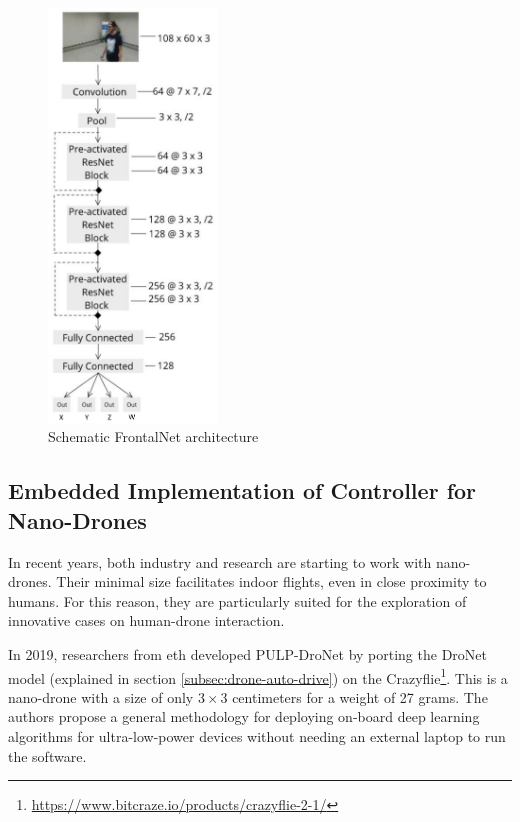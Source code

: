 \begin{figure}[H]
	\centering
	\includegraphics[width=0.4\textwidth]{"contents/images/03-frontalnet-1A"}
	\caption[Schematic FrontalNet architecture]{Schematic FrontalNet architecture \cite{mantegazza2019visionbased}}
	\label{fig:frontalnet-architecture-1}
\end{figure}



\subsection{Embedded Implementation of Controller for Nano-Drones}
\label{subsec:sota-nicky}

In recent years, both industry and research are starting to work with nano-drones. Their minimal size facilitates indoor flights, even in close proximity to humans. For this reason, they are particularly suited for the exploration of innovative cases on human-drone interaction.

\medskip

In 2019, researchers from \gls{eth} developed PULP-DroNet \cite{palossi2019pulpdronetIoTJ} by porting the DroNet \cite{Loquercio_2018} model (explained in section \ref{subsec:drone-auto-drive}) on the Crazyflie\footnote{\url{https://www.bitcraze.io/products/crazyflie-2-1/}}. This is a nano-drone with a size of only $3 \times 3$ centimeters for a weight of 27 grams. The authors propose a general methodology for deploying on-board deep learning algorithms for ultra-low-power devices without needing an external laptop to run the software.

